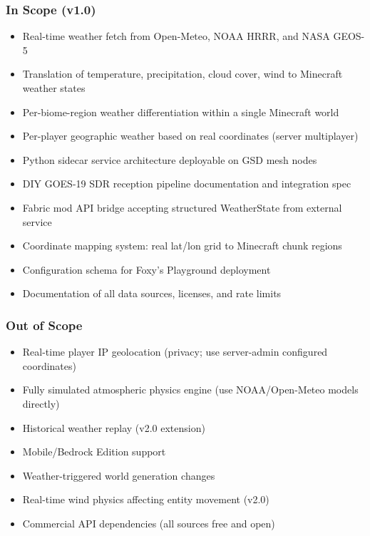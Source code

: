 \documentclass[11pt,letterpaper]{article}
\begin{document}
\subsubsection{In Scope (v1.0)}
\begin{itemize}[noitemsep]
  \item Real-time weather fetch from Open-Meteo, NOAA HRRR, and NASA GEOS-5
  \item Translation of temperature, precipitation, cloud cover, wind to Minecraft weather states
  \item Per-biome-region weather differentiation within a single Minecraft world
  \item Per-player geographic weather based on real coordinates (server multiplayer)
  \item Python sidecar service architecture deployable on GSD mesh nodes
  \item DIY GOES-19 SDR reception pipeline documentation and integration spec
  \item Fabric mod API bridge accepting structured WeatherState from external service
  \item Coordinate mapping system: real lat/lon grid to Minecraft chunk regions
  \item Configuration schema for Foxy's Playground deployment
  \item Documentation of all data sources, licenses, and rate limits
\end{itemize}

\subsubsection{Out of Scope}
\begin{itemize}[noitemsep]
  \item Real-time player IP geolocation (privacy; use server-admin configured coordinates)
  \item Fully simulated atmospheric physics engine (use NOAA/Open-Meteo models directly)
  \item Historical weather replay (v2.0 extension)
  \item Mobile/Bedrock Edition support
  \item Weather-triggered world generation changes
  \item Real-time wind physics affecting entity movement (v2.0)
  \item Commercial API dependencies (all sources free and open)
\end{itemize}
\end{document}
